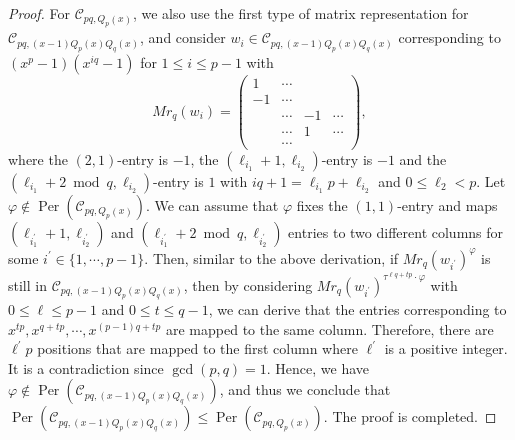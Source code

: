 \documentclass[journal,12pt,onecolumn]{IEEEtran}
\begin{document}
\begin{proof}
    For $\mathcal{C}_{pq,Q_p(x)}$, we also use the first type of matrix representation for $\mathcal{C}_{pq,(x-1)Q_p(x)Q_q(x)}$, and consider $w_i\in\mathcal{C}_{pq,(x-1)Q_p(x)Q_q(x)}$ corresponding to $(x^p-1)(x^{iq}-1)$ for $1\le i\le p-1$ with
    \[
        Mr_q(w_i) = \begin{pmatrix}
            1 & \cdots &  &  \\
            -1 & \cdots &  & \\
              & \cdots & -1 & \cdots \\
              & \cdots & 1 & \cdots \\
              & \cdots &  &
        \end{pmatrix},
    \]
    where the $(2,1)$-entry is $-1$, the $(\ell_{i_1}+1,\ell_{i_2})$-entry is $-1$ and the $(\ell_{i_1}+2\bmod{q},\ell_{i_2})$-entry is $1$ with $iq+1 = \ell_{i_1}p+\ell_{i_2}$ and $0\le\ell_2<p$. Let $\varphi\notin \operatorname{Per}(\mathcal{C}_{pq,Q_p(x)})$. We can assume that $\varphi$ fixes the $(1,1)$-entry and maps $(\ell_{i^\prime_1}+1,\ell_{i^\prime_2})$ and $(\ell_{i^\prime_1}+2\bmod{q},\ell_{i^\prime_2})$ entries to two different columns for some $i^\prime\in \{1,\cdots,p-1\}$. Then, similar to the above derivation, if $Mr_q(w_{i^\prime})^\varphi$ is still in $\mathcal{C}_{pq,(x-1)Q_p(x)Q_q(x)}$, then by considering $Mr_q(w_{i^\prime})^{\tau^{\ell q+tp}\cdot\varphi}$ with $0\le \ell\le p-1$ and $0\le t\le q-1$, we can derive that the entries corresponding to $x^{tp},x^{q+tp},\cdots,x^{(p-1)q+tp}$ are mapped to the same column. Therefore, there are $\ell^\prime p$ positions that are mapped to the first column where $\ell^\prime$ is a positive integer. It is a contradiction since $\gcd(p,q)=1$. Hence, we have $\varphi\notin \operatorname{Per}(\mathcal{C}_{pq,(x-1)Q_p(x)Q_q(x)})$, and thus we conclude that $\operatorname{Per}(\mathcal{C}_{pq,(x-1)Q_p(x)Q_q(x)})\leqslant \operatorname{Per}(\mathcal{C}_{pq,Q_p(x)})$. The proof is completed. 
\end{proof}
\end{document}
